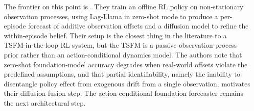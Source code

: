 The frontier on this point is \citet{Ada2025}. They train an offline RL policy on
non-stationary observation processes, using Lag-Llama in zero-shot mode to produce
a per-episode forecast of additive observation offsets and a diffusion model to
refine the within-episode belief. Their setup is the closest thing in the
literature to a TSFM-in-the-loop RL system, but the TSFM is a passive
observation-process prior rather than an action-conditional dynamics model. The
authors note that zero-shot foundation-model accuracy degrades when real-world
offsets violate the predefined assumptions, and that partial identifiability,
namely the inability to disentangle policy effect from exogenous drift from a
single observation, motivates their diffusion-fusion step. The action-conditional
foundation forecaster remains the next architectural step.
